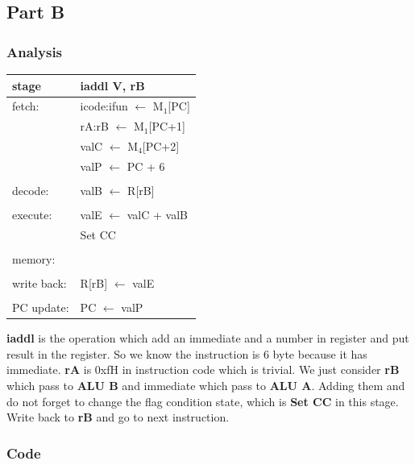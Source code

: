 \documentclass{article}
\begin{document}
\subsection{Part B}

\subsubsection{Analysis}
\begin{table}[H]
	\centering
	\begin{tabular}{p{5cm}p{5cm}}
		\hline
		stage	&iaddl V, rB\\
		\hline
		fetch:	&icode:ifun $\leftarrow $ M$_1$[PC]\\
				&rA:rB $\leftarrow$ M$_1$[PC+1]\\
				&valC $\leftarrow$ M$_4$[PC+2]\\
				&valP $\leftarrow$ PC + 6\\
		\\
		decode: &valB $\leftarrow$ R[rB]\\
		\\
		execute:&valE $\leftarrow$ valC + valB\\
				&Set CC\\
		\\
		memory: \\
		\\
		write back:&R[rB] $\leftarrow$ valE\\
		\\
		PC update:& PC $\leftarrow$ valP\\
		\hline
	\end{tabular}
\end{table}
\textbf{iaddl} is the operation which add an immediate and a number in register and put result in the register. So we know the instruction is 6 byte because it has immediate. \textbf{rA} is 0xfH in instruction code which is trivial. We just consider \textbf{rB} which pass to \textbf{ALU B} and immediate which pass to \textbf{ALU A}. Adding them and do not forget to change the flag condition state, which is \textbf{Set CC} in this stage. Write back to \textbf{rB} and go to next instruction.

\subsubsection{Code}
\end{document}
